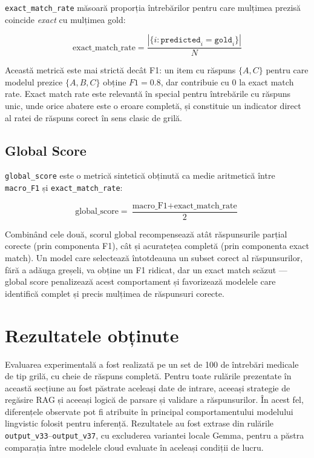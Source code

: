 \documentclass[12pt, a4paper, oneside, romanian]{teza-upb}
\begin{document}
\texttt{exact\_match\_rate} măsoară proporția întrebărilor pentru care mulțimea prezisă coincide \textit{exact} cu mulțimea gold:

\[ \text{exact\_match\_rate} = \frac{|\{i : \texttt{predicted}_i = \texttt{gold}_i\}|}{N} \]

Această metrică este mai strictă decât F1: un item cu răspuns $\{A, C\}$ pentru care modelul prezice $\{A, B, C\}$ obține $F1 = 0.8$, dar contribuie cu $0$ la exact match rate. Exact match rate este relevantă în special pentru întrebările cu răspuns unic, unde orice abatere este o eroare completă, și constituie un indicator direct al ratei de răspuns corect în sens clasic de grilă.

\subsection{Global Score}

\texttt{global\_score} este o metrică sintetică obținută ca medie aritmetică între \texttt{macro\_F1} și \texttt{exact\_match\_rate}:

\[ \text{global\_score} = \frac{\text{macro\_F1} + \text{exact\_match\_rate}}{2} \]

Combinând cele două, scorul global recompensează atât răspunsurile parțial corecte (prin componenta F1), cât și acuratețea completă (prin componenta exact match). Un model care selectează întotdeauna un subset corect al răspunsurilor, fără a adăuga greșeli, va obține un F1 ridicat, dar un exact match scăzut --- global score penalizează acest comportament și favorizează modelele care identifică complet și precis mulțimea de răspunsuri corecte.
\section{Rezultatele obținute}

Evaluarea experimentală a fost realizată pe un set de 100 de întrebări medicale de tip grilă, cu cheie de răspuns completă. Pentru toate rulările prezentate în această secțiune au fost păstrate aceleași date de intrare, aceeași strategie de regăsire RAG și aceeași logică de parsare și validare a răspunsurilor. În acest fel, diferențele observate pot fi atribuite în principal comportamentului modelului lingvistic folosit pentru inferență. Rezultatele au fost extrase din rulările \texttt{output\_v33}--\texttt{output\_v37}, cu excluderea variantei locale Gemma, pentru a păstra comparația între modelele cloud evaluate în aceleași condiții de lucru.
\end{document}
